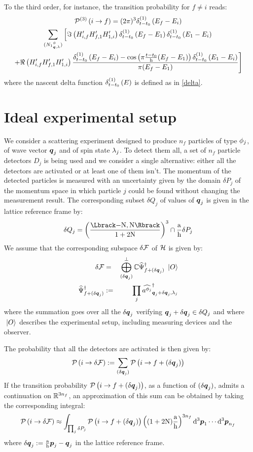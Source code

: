 \documentclass[10pt,a4paper,twoside,openany]{book}
\begin{document}
To the third order, for instance, the transition probability for $f \neq i$ reads:
\begin{multline*}
\TPn i f 3 = ( 2 \pi )^3 \deltaE1{E_f - E_i} \\
\sum_{\bFQ {N_1} \pt \q \sp} \left[ \Im \left( H'_{i,f} H'_{f,1} H'_{1,i} \right ) \deltaE1{E_f - E_1} \deltaE1{E_1 - E_i} \right. \\
\left. + \Re \left( H'_{i,f} H'_{f,1} H'_{1,i} \right ) \frac{\deltaE1{E_f - E_i} - \cos{\pi \frac{t - t_0} \h ( E_f - E_1 )} \deltaE1{E_1 - E_i}}{\pi ( E_f - E_1 )} \right]
\end{multline*}
where the nascent delta function $\deltaE1{E}$ is defined as in \ref{delta}.

\section{Ideal experimental setup}

We consider a scattering experiment designed to produce $n_f$ particles of type $\pt_j$, of wave vector $\q_j$ and of spin state $\sp_j$. To detect them all, a set of $n_f$ particle detectors $D_j$ is being used and we consider a single alternative: either all the detectors are activated or at least one of them isn't. The momentum of the detected particles is measured with an uncertainty given by the domain $\delta P_j$ of the momentum space in which particle $j$ could be found without changing the measurement result. The corresponding subset $\delta Q_j$ of values of $\q_j$ is given in the lattice reference frame by:
\begin{equation*}
\delta Q_j = \FLD \cap \frac \a \h \delta P_j
\end{equation*}
We assume that the corresponding subspace $\delta \F$ of $\H$ is given by:
\begin{eqnarray*}
\delta \F & = & \bigoplus_{(\delta \q_j)}^{\perp} \IC \dop{\Psi}_{f + (\delta \q_j)} \ket{O} \\
\dop{\Psi}_{f + (\delta \q_j)} & \eqdef & \prod_j \cop {\pt_j} {\q_j + \delta \q_j} {\sp_j}
\end{eqnarray*}
where the summation goes over all the $\delta \q_j$ verifying $\q_j + \delta \q_j \in \delta Q_j$ and where $\ket{O}$ describes the experimental setup, including measuring devices and the observer.

The probability that all the detectors are activated is then given by:
\begin{equation*}
\TP i {\delta \F} \eqdef \sum_{(\delta \q_j)} \TP i {f + (\delta \q_j)}
\end{equation*}
If the transition probability $\TP i {f + (\delta \q_j)}$, as a function of $(\delta \q_j)$, admits a continuation on $\IR^{3 n_f}$, an approximation of this sum can be obtained by taking the corresponding integral:
\begin{equation*}
\TP i {\delta \F} \approx \int_{\prod_j \delta P_j} \TP i {f + (\delta \q_j)} \left( (1 + 2 \N) \frac \a \h \right)^{3 n_f} \dtp_1 \dotsm \dtp_{n_f}
\end{equation*}
where $\delta \q_j \eqdef \frac \a \h \p_j - \q_j$ in the lattice reference frame.
\end{document}
